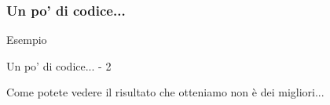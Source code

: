 \begin{frame}[fragile]
  \frametitle{Un po' di codice...}
  
  \begin{esempio}{Esempio}
  \end{esempio}
  
\end{frame}

\begin{frame}{Un po' di codice... - 2}
 
 \huge Come potete vedere il risultato che otteniamo non è dei migliori...
\end{frame}
